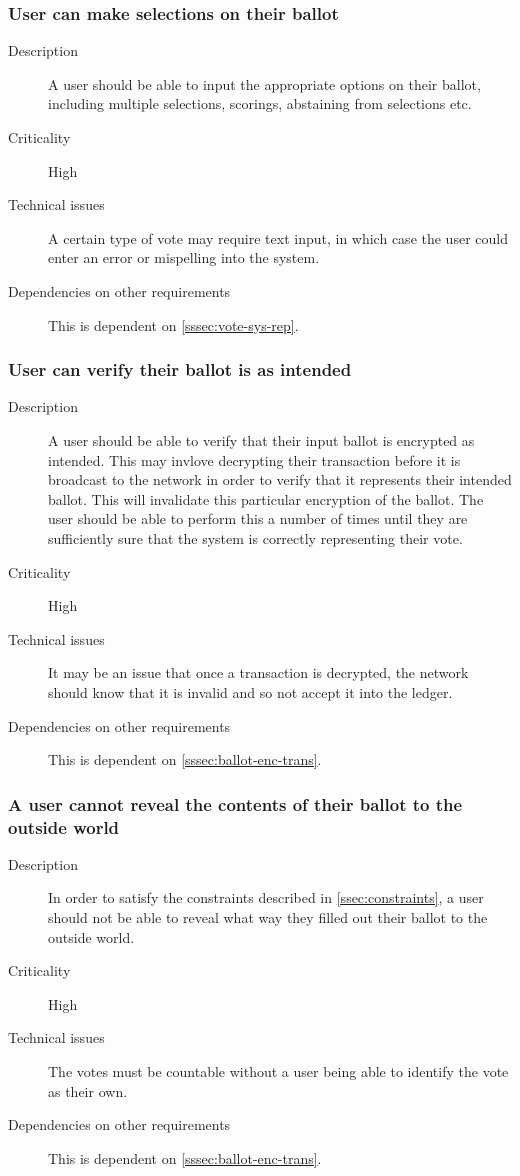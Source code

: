 \documentclass[a4paper,12pt]{article}
\begin{document}
\subsubsection{User can make selections on their ballot}
\begin{description}
	\item[Description]
		A user should be able to input the appropriate options on their ballot, including multiple selections, scorings, abstaining from selections etc.
	\item[Criticality]
		High
	\item[Technical issues]
		A certain type of vote may require text input, in which case the user could enter an error or mispelling into the system.
	\item[Dependencies on other requirements]
		This is dependent on \ref{sssec:vote-sys-rep}.
\end{description}

\subsubsection{User can verify their ballot is as intended}
\begin{description}
	\item[Description]
		A user should be able to verify that their input ballot is encrypted as intended. This may invlove decrypting their transaction before it is broadcast to the network in order to verify that it represents their intended ballot. This will invalidate this particular encryption of the ballot. The user should be able to perform this a number of times until they are sufficiently sure that the system is correctly representing their vote.
	\item[Criticality]
		High
	\item[Technical issues]
		It may be an issue that once a transaction is decrypted, the network should know that it is invalid and so not accept it into the ledger.
	\item[Dependencies on other requirements]
		This is dependent on \ref{sssec:ballot-enc-trans}.
\end{description}

\subsubsection{A user cannot reveal the contents of their ballot to the outside world}
\begin{description}
	\item[Description]
		In order to satisfy the constraints described in \ref{ssec:constraints}, a user should not be able to reveal what way they filled out their ballot to the outside world.
	\item[Criticality]
		High
	\item[Technical issues]
		The votes must be countable without a user being able to identify the vote as their own.
	\item[Dependencies on other requirements]
		This is dependent on \ref{sssec:ballot-enc-trans}.
\end{description}
\end{document}
